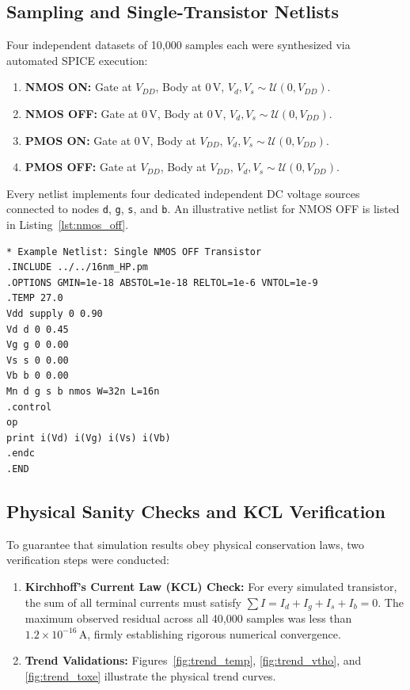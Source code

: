 \documentclass[11pt,a4paper]{article}
\begin{document}
\subsection{Sampling and Single-Transistor Netlists}
Four independent datasets of 10,000 samples each were synthesized via automated SPICE execution:
\begin{enumerate}
    \item \textbf{NMOS ON:} Gate at $V_{DD}$, Body at $0\,\text{V}$, $V_d, V_s \sim \mathcal{U}(0, V_{DD})$.
    \item \textbf{NMOS OFF:} Gate at $0\,\text{V}$, Body at $0\,\text{V}$, $V_d, V_s \sim \mathcal{U}(0, V_{DD})$.
    \item \textbf{PMOS ON:} Gate at $0\,\text{V}$, Body at $V_{DD}$, $V_d, V_s \sim \mathcal{U}(0, V_{DD})$.
    \item \textbf{PMOS OFF:} Gate at $V_{DD}$, Body at $V_{DD}$, $V_d, V_s \sim \mathcal{U}(0, V_{DD})$.
\end{enumerate}

Every netlist implements four dedicated independent DC voltage sources connected to nodes \texttt{d}, \texttt{g}, \texttt{s}, and \texttt{b}. An illustrative netlist for NMOS OFF is listed in Listing~\ref{lst:nmos_off}.

\begin{lstlisting}[caption={Example Single-Transistor Netlist (Deliverable 2: \texttt{netlists/fets/nmos\_off.sp})},label={lst:nmos_off}]
* Example Netlist: Single NMOS OFF Transistor
.INCLUDE ../../16nm_HP.pm
.OPTIONS GMIN=1e-18 ABSTOL=1e-18 RELTOL=1e-6 VNTOL=1e-9
.TEMP 27.0
Vdd supply 0 0.90
Vd d 0 0.45
Vg g 0 0.00
Vs s 0 0.00
Vb b 0 0.00
Mn d g s b nmos W=32n L=16n
.control
op
print i(Vd) i(Vg) i(Vs) i(Vb)
.endc
.END
\end{lstlisting}

\subsection{Physical Sanity Checks and KCL Verification}
To guarantee that simulation results obey physical conservation laws, two verification steps were conducted:
\begin{enumerate}
    \item \textbf{Kirchhoff's Current Law (KCL) Check:} For every simulated transistor, the sum of all terminal currents must satisfy $\sum I = I_d + I_g + I_s + I_b = 0$. The maximum observed residual across all 40,000 samples was less than $1.2 \times 10^{-16}\,\text{A}$, firmly establishing rigorous numerical convergence.
    \item \textbf{Trend Validations:} Figures~\ref{fig:trend_temp}, \ref{fig:trend_vtho}, and \ref{fig:trend_toxe} illustrate the physical trend curves.
\end{enumerate}
\end{document}
